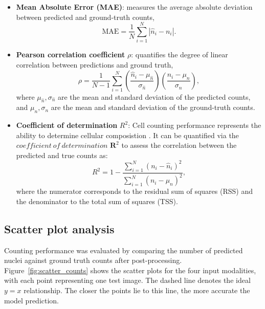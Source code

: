 \documentclass[target=bach,aauheader=,style=]{thud}
\begin{document}
\begin{itemize}
    \item \textbf{Mean Absolute Error (MAE)}: measures the average absolute deviation between predicted and ground-truth counts,
    \begin{equation}
        \mathrm{MAE} = \frac{1}{N}\sum_{i=1}^{N} \left| \hat{n}_i - n_i \right|.
    \end{equation}

    \item \textbf{Pearson correlation coefficient} $\rho$: quantifies the degree of linear correlation between predictions and ground truth,
    \begin{equation}
        \rho = \frac{1}{N-1}\sum_{i=1}^N 
        \left(\frac{\hat{n}_i - \mu_{\hat{n}}}{\sigma_{\hat{n}}}\right)
        \left(\frac{n_i - \mu_{n}}{\sigma_{n}}\right),
    \end{equation}
    where $\mu_{\hat{n}}, \sigma_{\hat{n}}$ are the mean and standard deviation of the predicted counts, and $\mu_{n}, \sigma_{n}$ are the mean and standard deviation of the ground-truth counts.

    \item \textbf{Coefficient of determination} $R^2$: Cell counting performance represents the ability to determine cellular composistion \cite{kirillov2019panoptic}. It can be quantified via the $coefficient\ of\ determination$ $\textbf{R}^2$ to assess the correlation between the predicted and true counts as:
    \begin{equation}
        R^2 = 1 - \frac{\sum_{i=1}^N (n_i - \hat{n}_i)^2}{\sum_{i=1}^N (n_i - \mu_{n})^2},
    \end{equation}
    where the numerator corresponds to the residual sum of squares (RSS) and the denominator to the total sum of squares (TSS).
\end{itemize}

\subsection{Scatter plot analysis}
Counting performance was evaluated by comparing the number of predicted nuclei against ground truth counts after post-processing. 
Figure~\ref{fig:scatter_counts} shows the scatter plots for the four input modalities, with each point representing one test image. 
The dashed line denotes the ideal $y=x$ relationship. 
The closer the points lie to this line, the more accurate the model prediction.
\end{document}
